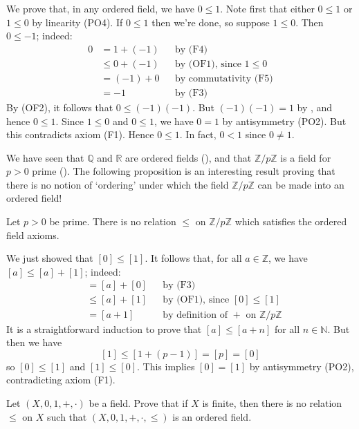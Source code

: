 \begin{example}
\label{exZeroIsLessThanOne}
We prove that, in any ordered field, we have $0 \le 1$. Note first that either $0 \le 1$ or $1 \le 0$ by linearity (PO4). If $0 \le 1$ then we're done, so suppose $1 \le 0$. Then $0 \le -1$; indeed:
\begin{align*}
0 &= 1 + (-1) && \text{by (F4)} \\
&\le 0+(-1) && \text{by (OF1), since $1 \le 0$} \\
&= (-1)+0 && \text{by commutativity (F5)} \\
&= -1 && \text{by (F3)}
\end{align*}
By (OF2), it follows that $0 \le (-1)(-1)$. But $(-1)(-1)=1$ by , and hence $0 \le 1$. Since $1 \le 0$ and $0 \le 1$, we have $0=1$ by antisymmetry (PO2). But this contradicts axiom (F1). Hence $0 \le 1$. In fact, $0<1$ since $0 \ne 1$.
\end{example}

We have seen that $\mathbb{Q}$ and $\mathbb{R}$ are ordered fields (), and that $\mathbb{Z}/p\mathbb{Z}$ is a field for $p>0$ prime (). The following proposition is an interesting result proving that there is no notion of `ordering' under which the field $\mathbb{Z}/p\mathbb{Z}$ can be made into an ordered field!

\begin{proposition}
Let $p>0$ be prime. There is no relation $\le$ on $\mathbb{Z}/p\mathbb{Z}$ which satisfies the ordered field axioms.
\end{proposition}
\begin{cproof}
We just showed that $[0] \le [1]$. It follows that, for all $a \in \mathbb{Z}$, we have $[a] \le [a]+[1]$; indeed:
\begin{align*}
[a] &= [a]+[0] && \text{by (F3)} \\
&\le [a]+[1] && \text{by (OF1), since $[0] \le [1]$} \\
&= [a+1] && \text{by definition of $+$ on $\mathbb{Z}/p\mathbb{Z}$}
\end{align*}
It is a straightforward induction to prove that $[a] \le [a+n]$ for all $n \in \mathbb{N}$. But then we have
\[ [1] \le [1+(p-1)] = [p] = [0] \]
so $[0] \le [1]$ and $[1] \le [0]$. This implies $[0]=[1]$ by antisymmetry (PO2), contradicting axiom (F1).
\end{cproof}

\begin{exercise}
Let $(X,0,1,+,{\cdot})$ be a field. Prove that if $X$ is finite, then there is no relation $\le$ on $X$ such that $(X,0,1,+,{\cdot},{\le})$ is an ordered field.
\end{exercise}

